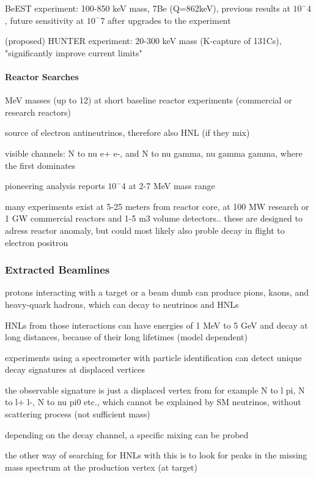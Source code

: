 BeEST experiment: 100-850 keV mass, 7Be (Q=862keV), previous results at $10^-4$ , future sensitivity at $10^-7$  after upgrades to the experiment

(proposed) HUNTER experiment: 20-300 keV mass (K-capture of 131Cs), "significantly improve current limits"


\paragraph{Reactor Searches}

MeV masses (up to 12) at short baseline reactor experiments (commercial or research reactors)

source of electron antineutrinos, therefore also HNL (if they mix)

visible channels: N to nu e+ e-, and N to nu gamma, nu gamma gamma, where the first dominates

pioneering analysis reports $10^-4$  at 2-7 MeV mass range


many experiments exist at 5-25 meters from reactor core, at 100 MW research or 1 GW commercial reactors and 1-5 m3 volume detectors.. these are designed to adress reactor anomaly, but could most likely also proble decay in flight to electron positron


\subsubsection{Extracted Beamlines}

protons interacting with a target or a beam dumb can produce pions, kaons, and heavy-quark hadrons, which can decay to neutrinos and HNLs

HNLs from those interactions can have energies of 1 MeV to 5 GeV and decay at long distances, because of their long lifetimes (model dependent)

experiments using a spectrometer with particle identification can detect unique decay signatures at displaced vertices

the observable signature is just a displaced vertex from for example N to l pi, N to l+ l-, N to nu pi0 etc., which cannot be explained by SM neutrinos, without scattering process (not sufficient mass)

depending on the decay channel, a specific mixing can be probed

the other way of searching for HNLs with this is to look for peaks in the missing mass spectrum at the production vertex (at target)

